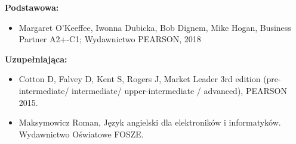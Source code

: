 \documentclass[12pt, a4paper]{article}
\begin{document}
\textbf{Podstawowa:}
\begin{itemize}
  \item Margaret O’Keeffee, Iwonna Dubicka, Bob Dignem, Mike Hogan, Business Partner A2+-C1; Wydawnictwo PEARSON, 2018
\end{itemize}

\textbf{Uzupełniająca:}
\begin{itemize}
  \item Cotton D, Falvey D, Kent S, Rogers J, Market Leader 3rd edition (pre-intermediate/ intermediate/ upper-intermediate / advanced), PEARSON 2015.
  \item Maksymowicz Roman, Język angielski dla elektroników i informatyków. Wydawnictwo Oświatowe FOSZE.
\end{itemize}
\end{document}
